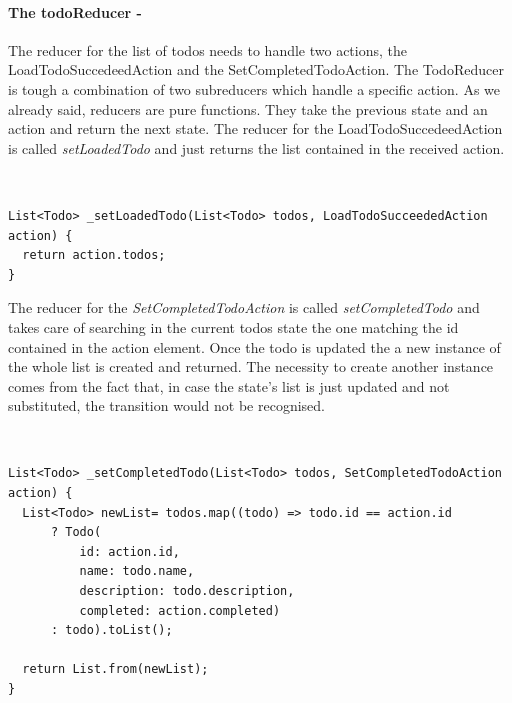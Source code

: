 \paragraph{The todoReducer - }
\label{subpar:todo_app_bloc_core_state}
The reducer for the list of todos needs to handle two actions, the LoadTodoSuccedeedAction and the SetCompletedTodoAction. The TodoReducer is tough a combination of two subreducers which handle a specific action. As we already said, reducers are pure functions. They take the previous state and an action and return the next state. The reducer for the LoadTodoSuccedeedAction is called \textit{setLoadedTodo} and just returns the list contained in the received action.
\begin{code}
\mbox{}\\
 \mbox{}
		\label{code:2.14}
\begin{verbatim}
List<Todo> _setLoadedTodo(List<Todo> todos, LoadTodoSucceededAction action) {
  return action.todos;
}
\end{verbatim}
\mbox{}
\end{code}
The reducer for the \textit{SetCompletedTodoAction} is called \textit{setCompletedTodo} and takes care of searching in the current todos state the one matching the id contained in the action element. Once the todo is updated the a new instance of the whole list is created and returned. The necessity to create another instance comes from the fact that, in case the state’s list is just updated and not substituted, the transition would not be recognised.
\begin{code}
\mbox{}\\
 \mbox{}
		\label{code:2.14}
\begin{verbatim}
List<Todo> _setCompletedTodo(List<Todo> todos, SetCompletedTodoAction action) {
  List<Todo> newList= todos.map((todo) => todo.id == action.id
      ? Todo(
          id: action.id,
          name: todo.name,
          description: todo.description,
          completed: action.completed)
      : todo).toList();

  return List.from(newList);
}
\end{verbatim}
\mbox{}
\end{code}


